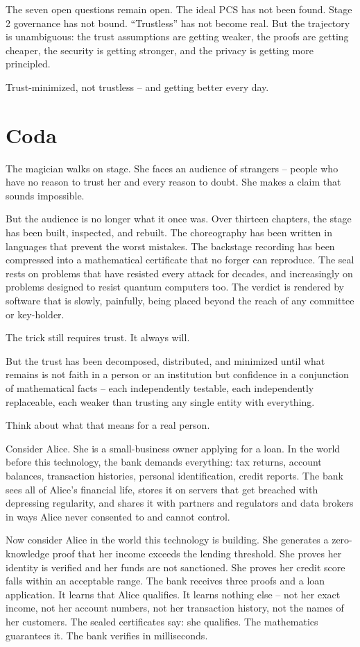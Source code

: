 \documentclass[
  11pt,
  openany]{report}
\begin{document}
The seven open questions remain open. The ideal PCS has not been found. Stage 2
governance has not bound. ``Trustless'' has not become real. But the trajectory
is unambiguous: the trust assumptions are getting weaker, the proofs are getting
cheaper, the security is getting stronger, and the privacy is getting more
principled.

Trust-minimized, not trustless -- and getting better every day.

\section{Coda}\label{coda}

The magician walks on stage. She faces an audience of strangers -- people who
have no reason to trust her and every reason to doubt. She makes a claim that
sounds impossible.

But the audience is no longer what it once was. Over thirteen chapters, the
stage has been built, inspected, and rebuilt. The choreography has been written
in languages that prevent the worst mistakes. The backstage recording has been
compressed into a mathematical certificate that no forger can reproduce. The
seal rests on problems that have resisted every attack for decades, and
increasingly on problems designed to resist quantum computers too. The verdict
is rendered by software that is slowly, painfully, being placed beyond the reach
of any committee or key-holder.

The trick still requires trust. It always will.

But the trust has been decomposed, distributed, and minimized until what remains
is not faith in a person or an institution but confidence in a conjunction of
mathematical facts -- each independently testable, each independently
replaceable, each weaker than trusting any single entity with everything.

Think about what that means for a real person.

Consider Alice. She is a small-business owner applying for a loan. In the world
before this technology, the bank demands everything: tax returns, account
balances, transaction histories, personal identification, credit reports. The
bank sees all of Alice's financial life, stores it on servers that get breached
with depressing regularity, and shares it with partners and regulators and data
brokers in ways Alice never consented to and cannot control.

Now consider Alice in the world this technology is building. She generates a
zero-knowledge proof that her income exceeds the lending threshold. She proves
her identity is verified and her funds are not sanctioned. She proves her credit
score falls within an acceptable range. The bank receives three proofs and a
loan application. It learns that Alice qualifies. It learns nothing else -- not
her exact income, not her account numbers, not her transaction history, not the
names of her customers. The sealed certificates say: she qualifies. The
mathematics guarantees it. The bank verifies in milliseconds.
\end{document}
